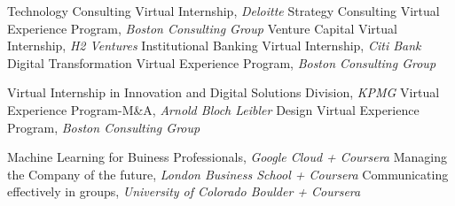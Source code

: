\begin{scholarship}
					{Technology Consulting Virtual Internship, \textit{Deloitte}}
					{Strategy Consulting Virtual Experience Program, \textit{Boston Consulting Group}}
					{Venture Capital Virtual Internship, \textit{H2 Ventures}}
					{Institutional Banking Virtual Internship, \textit{Citi Bank}}
					{Digital Transformation Virtual Experience Program, \textit{Boston Consulting Group}}

					{Virtual Internship in Innovation and Digital Solutions Division, \textit{KPMG}}
					{Virtual Experience Program-M\&A, \textit{Arnold Bloch Leibler}}
					{Design Virtual Experience Program, \textit{Boston Consulting Group}}
	
\end{scholarship}

\begin{scholarship}
					{Machine Learning for Buiness Professionals, \textit{Google Cloud + Coursera}}
					{Managing the Company of the future, \textit{London Business School + Coursera}}
					{Communicating effectively in groups, \textit{University of Colorado Boulder + Coursera}}
\end{scholarship}